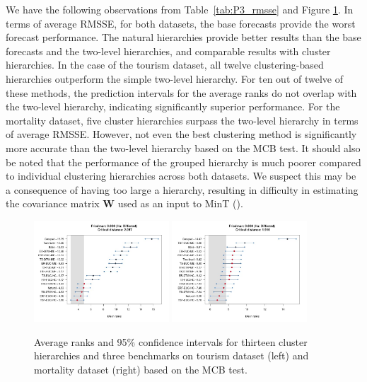 \documentclass[a4paper,review,12pt,authoryear]{elsarticle}
\begin{document}
We have the following observations from Table~\ref{tab:P3_rmsse} and Figure \ref{fig:P3_mcb_benchmark}. In terms of average RMSSE, for both datasets, the base forecasts provide the worst forecast performance. The natural hierarchies provide better results than the base forecasts and the two-level hierarchies, and comparable results with cluster hierarchies. In the case of the tourism dataset, all twelve clustering-based hierarchies outperform the simple two-level hierarchy. For ten out of twelve of these methods, the prediction intervals for the average ranks do not overlap with the two-level hierarchy, indicating significantly superior performance.
For the mortality dataset, five cluster hierarchies surpass the two-level hierarchy in terms of average RMSSE. However,  not even the best clustering method is significantly more accurate than the two-level hierarchy based on the MCB test. {It should also be noted that the performance of the grouped hierarchy is much poorer compared to individual clustering hierarchies across both datasets. We suspect this may be a consequence of having too large a hierarchy, resulting in difficulty in estimating the covariance matrix $\boldsymbol{W}$ used as an input to MinT (\citealp{pritulargaStochasticCoherencyForecast2021}).}

\begin{figure}[!h]
    \centering
    \vspace{0.1in}
    \includegraphics[width=0.45\textwidth]{../figures/Figure4_tourism_mcb_benchmarks.jpg}
    \includegraphics[width=0.45\textwidth]{../figures/Figure4_mortality_mcb_benchmarks.jpg}
    \caption{\label{fig:P3_mcb_benchmark}Average ranks and 95\% confidence intervals for { thirteen} cluster hierarchies and three benchmarks on tourism dataset (left) and mortality dataset (right) based on the MCB test.}
\end{figure}
\end{document}
